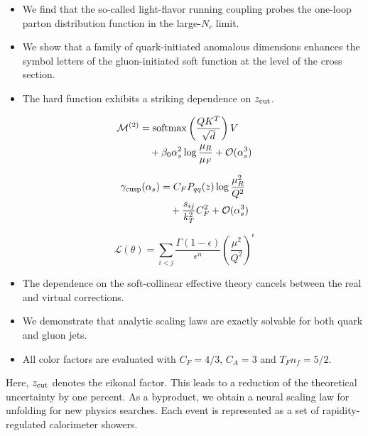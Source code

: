 \begin{itemize}
  \item We find that the so-called light-flavor running coupling probes the one-loop parton distribution function in the large-$N_c$ limit.
  \item We show that a family of quark-initiated anomalous dimensions enhances the symbol letters of the gluon-initiated soft function at the level of the cross section.
  \item The hard function exhibits a striking dependence on $z_{\rm cut}$.
\end{itemize}

\begin{align}
  \mathcal{M}^{(2)} &= \mathrm{softmax}\left(\frac{Q K^T}{\sqrt{d}}\right) V \nonumber \\
  &\quad + \beta_0 \alpha_s^2 \log\frac{\mu_R}{\mu_F} + \mathcal{O}(\alpha_s^3) \label{eq:2}
\end{align}

\begin{align}
  \gamma_{\rm cusp}(\alpha_s) &= C_F P_{qq}(z) \log\frac{\mu_R^2}{Q^2} \nonumber \\
  &\quad + \frac{s_{ij}}{k_T^2} C_F^2 + \mathcal{O}(\alpha_s^3) \label{eq:4}
\end{align}

\begin{equation}
  \mathcal{L}(\theta) = \sum_{i<j} \frac{\Gamma(1-\epsilon)}{\epsilon^{n}} \left(\frac{\mu^2}{Q^2}\right)^{\epsilon}
  \label{eq:5}
\end{equation}

\begin{itemize}
  \item The dependence on the soft-collinear effective theory cancels between the real and virtual corrections.
  \item We demonstrate that analytic scaling laws are exactly solvable for both quark and gluon jets.
  \item All color factors are evaluated with $C_F = 4/3$, $C_A = 3$ and $T_F n_f = 5/2$.
\end{itemize}

Here, $z_{\rm cut}$ denotes the eikonal factor. This leads to a
reduction of the theoretical uncertainty by one percent. As a byproduct,
we obtain a neural scaling law for unfolding for new physics searches.
Each event is represented as a set of rapidity-regulated calorimeter
showers.

